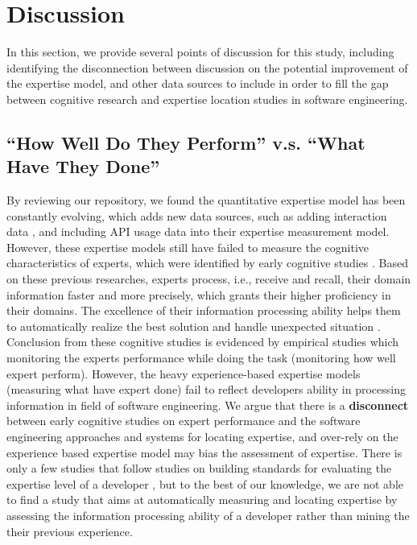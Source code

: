 \chapter{Discussion}

In this section, we provide several points of discussion for this study, including identifying the disconnection between  discussion on the potential improvement of the expertise model, and other data sources to include in order to fill the gap between cognitive research and expertise location studies in software engineering.

\section{``How Well Do They Perform'' v.s. ``What Have They Done''}

By reviewing our repository, we found the quantitative expertise model has been constantly evolving, which adds new data sources, such as adding interaction data \cite{fritz2010degree}, and including API usage data \cite{schuler2008mining} into their expertise measurement model. However, these expertise models still have failed to measure the cognitive characteristics of experts, which were identified by early cognitive studies \cite{MCKEITHEN1981307, Simon:1996:SA:237774, gobet1996recall}. Based on these previous researches, experts process, i.e., receive and recall, their domain information faster and more precisely, which grants their higher proficiency in their domains. The excellence of their information processing ability helps them to automatically realize the best solution and handle unexpected situation \cite{ericsson2006cambridge}. Conclusion from these cognitive studies is evidenced by empirical studies which monitoring the experts performance while doing the task (monitoring how well expert perform). However, the heavy experience-based expertise models (measuring what have expert done) fail to reflect developers ability in processing information in field of software engineering. We argue that there is a \textbf{disconnect} between early cognitive studies on expert performance and the software engineering approaches and systems for locating expertise, and over-rely on the experience based expertise model may bias the assessment of expertise. There is only a few studies that follow studies on building standards for evaluating the expertise level of a developer \cite{bergersen2014construction}, but to the best of our knowledge, we are not able to find a study that aims at automatically measuring and locating expertise by assessing the information processing ability of a developer rather than mining the their previous experience.

